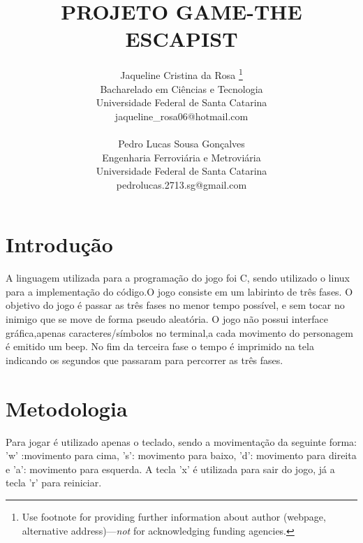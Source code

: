 \documentclass[journal]{IEEEtran}
\title                                                {PROJETO GAME-THE ESCAPIST}{}
\author{
  Jaqueline Cristina da Rosa  \thanks{Use footnote for providing further
    information about author (webpage, alternative
    address)---\emph{not} for acknowledging funding agencies.} \\
  Bacharelado em Ciências e Tecnologia \\
  Universidade Federal de Santa Catarina\\
  jaqueline_rosa06@hotmail.com\\
  \texttt{}
   \And
 \\Pedro Lucas Sousa Gonçalves \\
  Engenharia Ferroviária e Metroviária\\
  Universidade Federal de Santa Catarina\\
  pedrolucas.2713.sg@gmail.com \\
  \texttt{}
}
\begin{document}
\maketitle
\IEEEdisplaynontitleabstractindextext
\IEEEpeerreviewmaketitle


\section{Introdução}
A linguagem utilizada para a programação do jogo foi C,  sendo utilizado o linux para a implementação do código.O  jogo consiste em um labirinto de três fases. O objetivo do jogo é passar as três fases no menor tempo possível, e sem tocar no inimigo que se move de forma pseudo aleatória. O jogo não possui interface gráfica,apenas caracteres/símbolos no terminal,a cada movimento do personagem  é emitido um beep. No fim da terceira fase o tempo é imprimido na tela indicando os segundos  que passaram para percorrer as três fases.









\section{Metodologia}
Para jogar é utilizado apenas o teclado, sendo a movimentação da seguinte forma: 'w' :movimento para cima, 's': movimento para baixo, 'd': movimento para direita e 'a': movimento para esquerda. A tecla 'x' é utilizada para sair do jogo, já a tecla 'r' para reiniciar.
\end{document}
